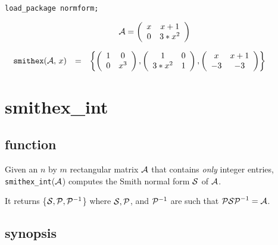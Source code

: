 {\tt load\_package normform;}

\begin{displaymath}
{\cal A} = \left( \begin{array}{cc} x & x+1 \\ 0 & 3*x^2 \end{array} 
\right)
\end{displaymath}

\begin{displaymath}
\hspace{-0.5in}
\begin{array}{ccc}
{\tt smithex}({\cal A},\, x) & = & 
\left\{ \left( \begin{array}{cc} 1 & 0 \\ 
0 & x^3 \end{array} \right), \left( \begin{array}{cc} 1 & 0 \\ 3*x^2 
& 1 \end{array} \right), \left( \begin{array}{cc} x & x+1 \\ -3 & -3 
\end{array} \right) \right\} \end{array}
\end{displaymath}


\section{smithex\_int}

\subsection{function}

Given an $n$ by $m$ rectangular matrix ${\cal A}$ that contains 
{\it only} integer entries, {\tt smithex\_int}(${\cal A}$) computes the
Smith normal form ${\cal S}$ of ${\cal A}$.

It returns \{${\cal S}, {\cal P}, {\cal P}^{-1}$\} where ${\cal S}, 
{\cal P}$, and ${\cal P}^{-1}$ are such that ${\cal P S P}^{-1} = 
{\cal A}$.


\subsection{synopsis}

